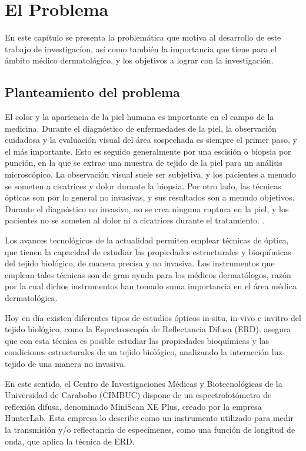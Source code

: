 \chapter{El Problema}

En este cap\'{i}tulo se presenta la problem\'{a}tica que motiva al desarrollo de este trabajo de investigac\'{i}on, as\'{i} como tambi\'{e}n la importancia que tiene para el \'{a}mbito m\'{e}dico dermatol\'{o}gico, y los objetivos a lograr con la investigaci\'{o}n.

	\section{Planteamiento del problema}	
El color y la apariencia de la piel humana es importante en el campo de la medicina. Durante el diagn\'{o}stico de enfermedades de la piel, la observaci\'{o}n cuidadosa y la evaluaci\'{o}n visual del \'{a}rea sospechada es siempre el primer paso, y el m\'{a}s importante. Esto es seguido generalmente por una escisi\'{o}n o biopsia por punci\'{o}n, en la que se extrae una muestra de tejido de la piel para un an\'{a}lisis microsc\'{o}pico. La observaci\'{o}n visual suele ser subjetiva, y los pacientes a menudo se someten a cicatrices y dolor durante la biopsia. Por otro lado, las t\'{e}cnicas \'{o}pticas son por lo general no invasivas, y sus resultados son a menudo objetivos. Durante el diagn\'{o}stico no invasivo, no se crea ninguna ruptura en la piel, y los pacientes no se someten al dolor ni a cicatrices durante el tratamiento. \cite{Bersha}.

Los avances tecnol\'{o}gicos de la actualidad permiten emplear t\'{e}cnicas de \'{o}ptica, que tienen la capacidad de estudiar  las propiedades estructurales y bioqu\'{i}micas del tejido biol\'{o}gico, de manera precisa y no invasiva. Los instrumentos que emplean tales t\'{e}cnicas son de gran ayuda para los m\'{e}dicos dermat\'{o}logos, raz\'{o}n por la cual dichos instrumentos han tomado suma importancia en el \'{a}rea m\'{e}dica dermatol\'{o}gica.

Hoy en d\'{i}a existen diferentes tipos de estudios \'{o}pticos in-situ, in-vivo e invitro del tejido biol\'{o}gico, como la Espectroscop\'{i}a de Reflectancia Difusa (ERD). \cite{Perez} asegura que con esta t\'{e}cnica es  posible estudiar las propiedades bioqu\'{i}micas y las condiciones estructurales de un tejido biol\'{o}gico, analizando la interacci\'{o}n luz-tejido de una manera no invasiva.

En este sentido, el Centro de Investigaciones M\'{e}dicas y Biotecnol\'{o}gicas de la Universidad de Carabobo (CIMBUC) dispone de un espectrofot\'{o}metro de reflexi\'{o}n difusa, denominado MiniScan XE Plus, creado por la empresa HunterLab. Esta empresa lo describe como un instrumento utilizado para medir la transmisi\'{o}n y/o reflectancia de espec\'{i}menes, como una funci\'{o}n de longitud de onda, que aplica la t\'{e}cnica de ERD. 

